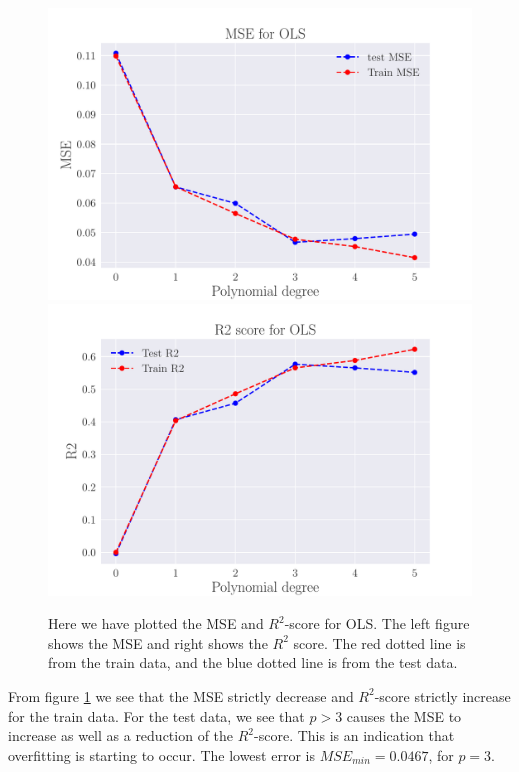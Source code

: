 \documentclass[reprint,english,notitlepage,aps,nobalancelastpage,nofootinbib]{revtex4-1}  %
\begin{document}
\begin{figure}[H]
	\includegraphics[width=\linewidth]{MSE_OLS_n30_eps02_pol5.pdf}
	\endminipage\hfill
	\includegraphics[width=\linewidth]{R2_OLS_n30_eps02_pol5.pdf}
	\endminipage
	\caption{Here we have plotted the MSE and $R^2$-score for OLS. The left figure shows the MSE and right shows the $R^2$ score. The red dotted line is from the train data, and the blue dotted line is from the test data.}\label{fig:OLS_R2_and_MSE}
\end{figure}
From figure \ref{fig:OLS_R2_and_MSE} we see that the MSE strictly decrease and $R^2$-score strictly increase for the train data. For the test data, we see that $p>3$ causes the MSE to increase as well as a reduction of the $R^2$-score. This is an indication that overfitting is starting to occur. The lowest error is $MSE_{min} = 0.0467$, for $p=3$.
\end{document}
